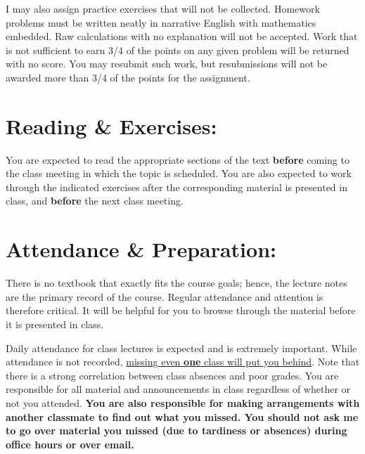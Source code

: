 \documentclass[margin]{res}
\theoremstyle{plain}
\theoremstyle{definition}
\theoremstyle{remark}
\begin{document}
\begin{resume}
I may also assign practice exercises that will not be collected. Homework                                                                                                                                                                                                        problems must be written neatly in narrative English with mathematics embedded. Raw calculations                                                                                                                                                                                                                                                                                                                                               with no explanation will not be accepted. Work that is not sufficient to earn 3/4 of the points on any given problem will be returned with no score. You may resubmit such work, but resubmissions will not be awarded more than 3/4 of the points for the assignment.

\section{Reading \& Exercises:} You are expected to read the appropriate sections of the text \textbf{before} coming to the class meeting in which the topic is scheduled. You are also expected to work through the indicated exercises after the corresponding  material is presented in class, and \textbf{before} the next class meeting.

\section{Attendance \& Preparation:} 
There is no textbook that exactly fits the course goals; hence, the lecture notes are the primary record of the course. Regular attendance and attention is therefore critical. It will be helpful for you to browse through the material before it is presented in class.

Daily attendance for class lectures is expected and is extremely important. 
While attendance is not recorded, \underline{missing even \textbf{one} class will put you behind}. Note that there is a strong correlation between class absences and poor grades.   You are responsible for all material and announcements in class regardless of whether or not you attended.  \textbf{You are also responsible for making arrangements with another classmate to find out what you missed.  You should not ask me to go over material you missed (due to tardiness or absences) during office hours or over email.} 


\end{resume}
\end{document}
